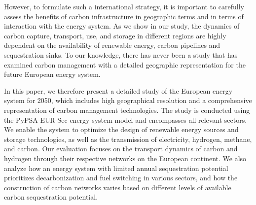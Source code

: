 \documentclass[conference]{IEEEtran}
\begin{document}



However, to formulate such a international strategy, it is important to carefully assess the benefits of carbon infrastructure in geographic terms and in terms of interaction with the energy system. As we show in our study, the dynamics of carbon capture, transport, use, and storage in different regions are highly dependent on the availability of renewable energy, carbon pipelines and sequestration sinks. To our knowledge, there has never been a study that has examined carbon management with a detailed geographic representation for the future European energy system.

In this paper, we therefore present a detailed study of the European energy system for 2050, which includes high geographical resolution and a comprehensive representation of carbon management technologies. The study is conducted using the PyPSA-EUR-Sec energy system model and encompasses all relevant sectors. We enable the system to optimize the design of renewable energy sources and storage technologies, as well as the transmission of electricity, hydrogen, methane, and carbon. Our evaluation focuses on the transport dynamics of carbon and hydrogen through their respective networks on the European continent. We also analyze how an energy system with limited annual sequestration potential prioritizes decarbonization and fuel switching in various sectors, and how the construction of carbon networks varies based on different levels of available carbon sequestration potential.
\end{document}
